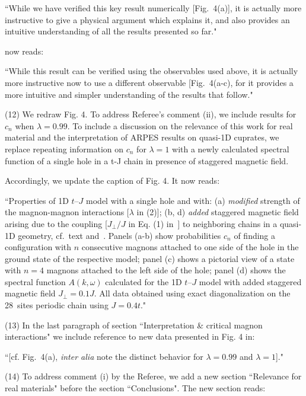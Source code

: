 \documentclass[%
 manuscript,
 amsmath,amssymb,
 aps, onecolumn,
prl,
]{revtex4-1}
\begin{document}
``While we have verified this key result numerically [Fig.~4(a)], it is actually more instructive to give a physical argument which explains it, and also provides an intuitive understanding of all the results presented so far."

now reads:

``While this result can be verified using the observables used above, it is actually more instructive now to use a different observable [Fig.~4(a-c), for it provides a more intuitive and simpler understanding of the results that follow."

(12) We redraw Fig. 4. To address Referee's comment (ii), we include results for $c_n$ when $\lambda = 0.99$. To include a discussion on the relevance of this work for real material and the interpretation of ARPES results on quasi-1D cuprates, we replace repeating information on $c_n$ for $\lambda = 1$ with a newly calculated spectral function of a single hole in a t-J chain in presence of staggered magnetic field. 

Accordingly, we update the caption of Fig. 4. It now reads:

``Properties of 1D $t$--$J$ model with a single hole and with: (a) {\it modified} strength of the magnon-magnon interactions [$\lambda$ in (2)]; (b, d) {\it added} staggered magnetic field arising due to the coupling [$J_\perp / J$ in Eq. (1) in~\cite{SM}] to neighboring chains in a quasi-1D geometry, cf.~text and~\cite{SM}. Panels (a-b) show probabilities $c_n$ of finding a configuration with $n$ consecutive magnons attached to one side of the hole in the ground state of the respective model; panel (c) shows a pictorial view of a state with $n=4$ magnons attached to the left side of the hole; panel (d) shows the spectral function $A(k,\omega)$ calculated for the 1D $t$--$J$ model with added staggered magnetic field $J_\perp = 0.1J$. All data obtained using exact diagonalization on the 28~sites periodic chain using $J=0.4t$."

(13) In the last paragraph of section ``Interpretation \& critical magnon interactions" we include reference to new data presented in Fig. 4 in:

``[cf. Fig.~4(a), {\it inter alia} note the distinct behavior for $\lambda =0.99$ and $\lambda =1 $]."

(14) To address comment (i) by the Referee, we add a new section ``Relevance for real materials" before the section ``Conclusions". The new section reads:
\end{document}
